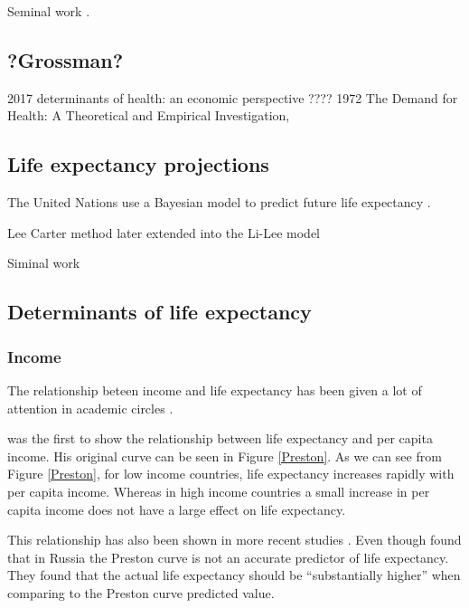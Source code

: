 \documentclass[10pt,a4paper]{article}
\begin{document}
Seminal work \cite{Fergany1971}.

\subsection{?Grossman?}
2017 determinants of health: an economic perspective  ????
1972 The Demand for Health: A Theoretical and Empirical Investigation,

\cite{Grossman2000}

\subsection{Life expectancy projections}

The United Nations use a Bayesian model to predict future life expectancy \citep{Raftery2014}.

Lee Carter method \cite{Shang2011} later extended into the Li-Lee model

Siminal work \cite{Lee1992}

\cite{Bongaarts2005}

\subsection{Determinants of life expectancy}



\subsubsection{Income}

The relationship beteen income and life expectancy has been given a lot of attention in academic circles \citep{Preston1975, Hu2015, Chetty2016, Oeppen2019}. 

\cite{Preston1975} was the first to show the relationship between life expectancy and per capita income. His original curve can be seen in Figure \ref{Preston}. As we can see from Figure \ref{Preston}, for low income countries, life expectancy increases rapidly with per capita income. Whereas in high income countries a small increase in per capita income does not have a large effect on life expectancy.

This relationship has also been shown in more recent studies \citep{Chetty2016,Oeppen2019}. Even though \cite{Shkol2019} found that in Russia the Preston curve is not an accurate predictor of life expectancy. They found that the actual life expectancy should be ``substantially higher'' when comparing to the Preston curve predicted value. 
\end{document}
